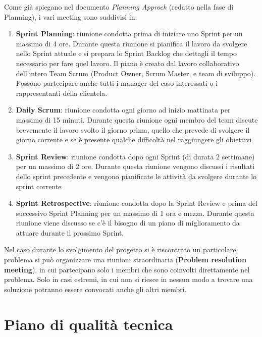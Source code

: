 \documentclass{article}
\begin{document}
Come già spiegano nel documento \textit{Planning Approch} (redatto nella fase di Planning), i vari meeting sono suddivisi in:
\begin{enumerate}
    \item \textbf{Sprint Planning}: riunione condotta prima di iniziare uno Sprint per un massimo di 4 ore.
    Durante questa riunione si pianifica il lavoro da svolgere nello Sprint attuale e si 
    prepara lo Sprint Backlog che dettagli il tempo necessario per fare quel lavoro. 
    Il piano è creato dal lavoro collaborativo dell'intero Team Scrum (Product Owner, Scrum Master, e team di sviluppo).
    Possono partecipare anche tutti i manager del caso interessati o i rappresentanti della clientela.

    \item \textbf{Daily Scrum}: riunione condotta ogni giorno ad inizio mattinata per massimo di 15 minuti. 
    Durante questa riunione ogni membro del team discute brevemente il lavoro svolto il giorno prima, 
    quello che prevede di svolgere il giorno corrente e se è presente qualche difficoltà nel raggiungere 
    gli obiettivi
    
    \item \textbf{Sprint Review}: riunione condotta dopo ogni Sprint (di durata 2 settimane) per un massimo di 2 ore.
    Durante questa riunione vengono discussi i risultati dello sprint precedente
    e vengono pianificate le attività da svolgere durante lo sprint corrente
    
    \item \textbf{Sprint Retrospective}: riunione condotta dopo la Sprint Review e
    prima del successivo Sprint Planning per un massimo di 1 ora e mezza. 
    Durante questa riunione viene discusso se c'è il bisogno di un piano di miglioramento 
    da attuare durante il prossimo Sprint.
\end{enumerate}

Nel caso durante lo svolgimento del progetto si è riscontrato un particolare problema si può organizzare una riunioni straordinaria
(\textbf{Problem resolution meeting}), in cui partecipano solo i membri che sono coinvolti direttamente nel problema. 
Solo in casi estremi, in cui non si riesce in nessun modo a trovare una soluzione potranno essere convocati anche gli altri membri.

\section{Piano di qualità tecnica}
\end{document}
